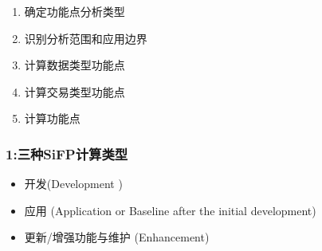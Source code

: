 \begin{enumerate}
\tightlist
\item
  确定功能点分析类型
\item
  识别分析范围和应用边界
\item
  计算数据类型功能点
\item
  计算交易类型功能点
\item
  计算功能点
\end{enumerate}

\hypertarget{ux4e09ux79cdsifpux8ba1ux7b97ux7c7bux578b}{%
\subsubsection{1:三种SiFP计算类型}\label{ux4e09ux79cdsifpux8ba1ux7b97ux7c7bux578b}}

\begin{itemize}
\tightlist
\item
  开发(Development )
\end{itemize}

\begin{description}
\item[]
\end{description}

\begin{itemize}
\tightlist
\item
  应用 (Application or Baseline after the initial development)
\end{itemize}

\begin{description}
\item[]
\end{description}

\begin{itemize}
\tightlist
\item
  更新/增强功能与维护 (Enhancement)
\end{itemize}

\begin{description}
\item[]
\end{description}

